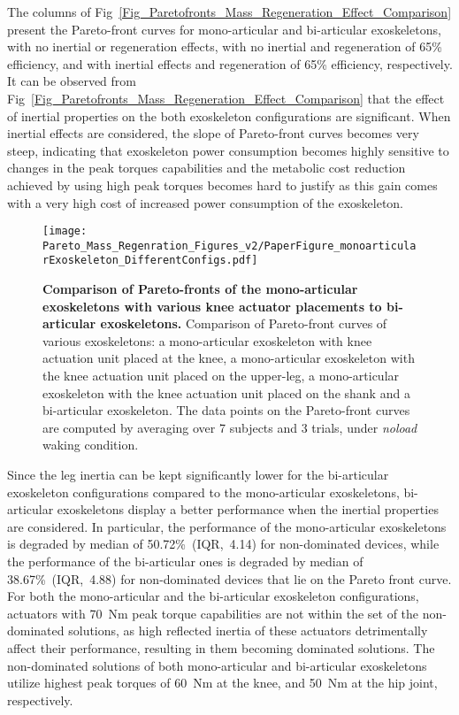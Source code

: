 \documentclass[10pt,letterpaper]{article}
\begin{document}

The columns of Fig~\ref{Fig_Paretofronts_Mass_Regeneration_Effect_Comparison} present the Pareto-front curves for mono-articular and bi-articular exoskeletons, with no inertial or regeneration effects, with no inertial and  regeneration of 65\% efficiency, and with inertial effects and regeneration of 65\% efficiency, respectively. It can be observed from Fig~\ref{Fig_Paretofronts_Mass_Regeneration_Effect_Comparison} that the effect of inertial properties on the both exoskeleton configurations are significant. When inertial effects are considered, the slope of Pareto-front curves becomes very steep, indicating that exoskeleton power consumption becomes highly sensitive to changes in the peak torques capabilities and  the metabolic cost reduction achieved by using high peak torques becomes hard to justify as this gain comes with a very high  cost of increased power consumption of the exoskeleton.

\begin{figure*}[ht]
	\centering
	\texttt{[image: Pareto\_Mass\_Regenration\_Figures\_v2/PaperFigure\_monoarticularExoskeleton\_DifferentConfigs.pdf]}
	\vspace{-3mm}
	\caption{{\small\textbf{Comparison of Pareto-fronts of the mono-articular exoskeletons with various knee actuator placements to bi-articular exoskeletons.} Comparison of Pareto-front curves of various exoskeletons: a mono-articular exoskeleton with knee actuation unit placed at the knee, a mono-articular exoskeleton with the knee actuation unit placed on the upper-leg, a mono-articular exoskeleton with the knee actuation unit placed on the shank and a bi-articular exoskeleton. The data points on the Pareto-front curves are computed by averaging over 7 subjects and 3 trials, under \emph{noload} waking condition.}}
	\label{Fig_monoarticularExoskeleton_DifferentConfigs}
\end{figure*}



Since the leg inertia can be kept significantly lower for the bi-articular exoskeleton configurations compared to the mono-articular exoskeletons, bi-articular exoskeletons display a better performance when the inertial properties are considered. In particular, the performance of the mono-articular exoskeletons is degraded by median of 50.72\%~(IQR,~4.14) for non-dominated devices, while the performance of the bi-articular ones is degraded by median of 38.67\%~(IQR,~4.88) for non-dominated devices that lie on the Pareto front curve. For both the mono-articular and the bi-articular exoskeleton configurations, actuators with 70~Nm peak torque capabilities are not within the set of the non-dominated solutions, as high reflected inertia of these actuators detrimentally affect their performance, resulting in them becoming dominated solutions. The non-dominated solutions of both mono-articular and bi-articular exoskeletons utilize highest peak torques of 60~Nm at the knee, and 50~Nm at the hip joint, respectively.
\end{document}
